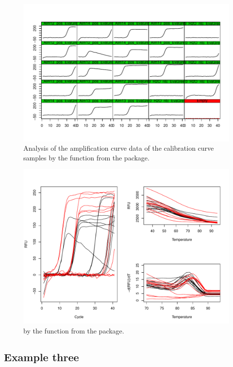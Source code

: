 \begin{figure}[htbp]
  \centering
  \includegraphics{figures/plotCurves.pdf}
  \caption{Analysis of the amplification curve data of the calibration curve 
samples by the  function from the  package.}
  \label{figure:plotCurves}
\end{figure}

\begin{figure}[htbp]
  \centering
  \includegraphics[clip=true, width=16cm]{figures/amp_melt.pdf}
  \caption{by the  function from the  package.}
  \label{figure:amp_melt}
\end{figure}

\subsection{Example three}

